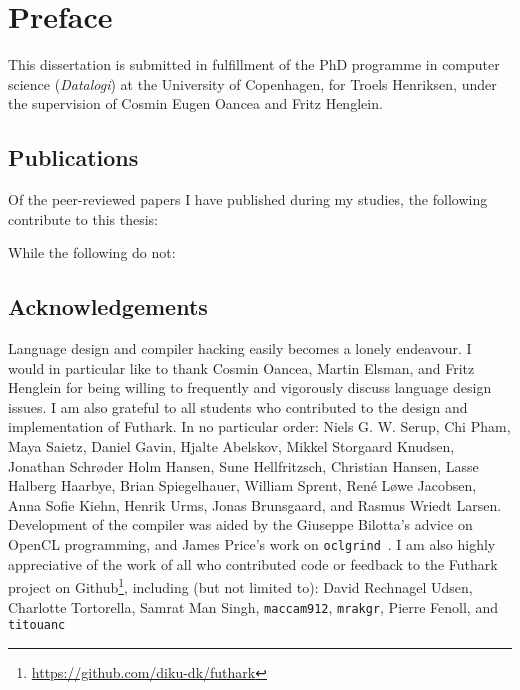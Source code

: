 {}
\chapter*{Preface}

This dissertation is submitted in fulfillment of the PhD programme in
computer science (\textit{Datalogi}) at the University of Copenhagen,
for Troels Henriksen, under the supervision of Cosmin Eugen Oancea and
Fritz Henglein.

\section{Publications}

Of the peer-reviewed papers I have published during my studies, the
following contribute to this thesis:

\begin{quote}
\end{quote}
\begin{quote}
\end{quote}
\begin{quote}
\end{quote}

\noindent While the following do not:

\begin{quote}
\end{quote}
\begin{quote}
\end{quote}
\begin{quote}
\end{quote}

\section{Acknowledgements}

Language design and compiler hacking easily becomes a lonely
endeavour.  I would in particular like to thank Cosmin Oancea, Martin
Elsman, and Fritz Henglein for being willing to frequently and
vigorously discuss language design issues.  I am also grateful to all
students who contributed to the design and implementation of Futhark.
In no particular order: Niels G. W. Serup, Chi Pham, Maya Saietz,
Daniel Gavin, Hjalte Abelskov, Mikkel Storgaard Knudsen, Jonathan
Schrøder Holm Hansen, Sune Hellfritzsch, Christian Hansen, Lasse
Halberg Haarbye, Brian Spiegelhauer, William Sprent, René Løwe
Jacobsen, Anna Sofie Kiehn, Henrik Urms, Jonas Brunsgaard, and Rasmus
Wriedt Larsen.  Development of the compiler was aided by the Giuseppe
Bilotta's advice on OpenCL programming, and James Price's work on
\texttt{oclgrind}~\cite{price2015oclgrind}.  I am also highly
appreciative of the work of all who contributed code or feedback to
the Futhark project on
Github\footnote{\url{https://github.com/diku-dk/futhark}}, including
(but not limited to): David Rechnagel Udsen, Charlotte Tortorella,
Samrat Man Singh, \texttt{maccam912}, \texttt{mrakgr}, Pierre Fenoll,
and \texttt{titouanc}

